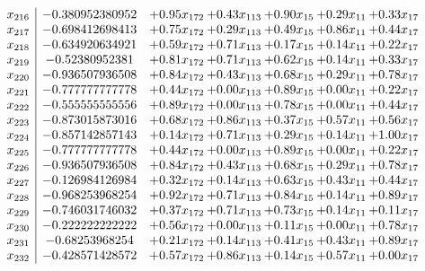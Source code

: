 \documentclass[8pt]{article}
\begin{document}
\[\begin{array}{c| c c@{\hskip 2pt} c@{\hskip 2pt} c@{\hskip 2pt} c@{\hskip 2pt} c@{\hskip 2pt} }
 x_{216}   &  -0.380952380952 & +  0.95 x_{172} & +  0.43 x_{113} & +  0.90 x_{15} & +  0.29 x_{11} & +  0.33 x_{17}\\
 x_{217}   &  -0.698412698413 & +  0.75 x_{172} & +  0.29 x_{113} & +  0.49 x_{15} & +  0.86 x_{11} & +  0.44 x_{17}\\
 x_{218}   &  -0.634920634921 & +  0.59 x_{172} & +  0.71 x_{113} & +  0.17 x_{15} & +  0.14 x_{11} & +  0.22 x_{17}\\
 x_{219}   &  -0.52380952381 & +  0.81 x_{172} & +  0.71 x_{113} & +  0.62 x_{15} & +  0.14 x_{11} & +  0.33 x_{17}\\
 x_{220}   &  -0.936507936508 & +  0.84 x_{172} & +  0.43 x_{113} & +  0.68 x_{15} & +  0.29 x_{11} & +  0.78 x_{17}\\
 x_{221}   &  -0.777777777778 & +  0.44 x_{172} & +  0.00 x_{113} & +  0.89 x_{15} & +  0.00 x_{11} & +  0.22 x_{17}\\
 x_{222}   &  -0.555555555556 & +  0.89 x_{172} & +  0.00 x_{113} & +  0.78 x_{15} & +  0.00 x_{11} & +  0.44 x_{17}\\
 x_{223}   &  -0.873015873016 & +  0.68 x_{172} & +  0.86 x_{113} & +  0.37 x_{15} & +  0.57 x_{11} & +  0.56 x_{17}\\
 x_{224}   &  -0.857142857143 & +  0.14 x_{172} & +  0.71 x_{113} & +  0.29 x_{15} & +  0.14 x_{11} & +  1.00 x_{17}\\
 x_{225}   &  -0.777777777778 & +  0.44 x_{172} & +  0.00 x_{113} & +  0.89 x_{15} & +  0.00 x_{11} & +  0.22 x_{17}\\
 x_{226}   &  -0.936507936508 & +  0.84 x_{172} & +  0.43 x_{113} & +  0.68 x_{15} & +  0.29 x_{11} & +  0.78 x_{17}\\
 x_{227}   &  -0.126984126984 & +  0.32 x_{172} & +  0.14 x_{113} & +  0.63 x_{15} & +  0.43 x_{11} & +  0.44 x_{17}\\
 x_{228}   &  -0.968253968254 & +  0.92 x_{172} & +  0.71 x_{113} & +  0.84 x_{15} & +  0.14 x_{11} & +  0.89 x_{17}\\
 x_{229}   &  -0.746031746032 & +  0.37 x_{172} & +  0.71 x_{113} & +  0.73 x_{15} & +  0.14 x_{11} & +  0.11 x_{17}\\
 x_{230}   &  -0.222222222222 & +  0.56 x_{172} & +  0.00 x_{113} & +  0.11 x_{15} & +  0.00 x_{11} & +  0.78 x_{17}\\
 x_{231}   &  -0.68253968254 & +  0.21 x_{172} & +  0.14 x_{113} & +  0.41 x_{15} & +  0.43 x_{11} & +  0.89 x_{17}\\
 x_{232}   &  -0.428571428572 & +  0.57 x_{172} & +  0.86 x_{113} & +  0.14 x_{15} & +  0.57 x_{11} & +  0.00 x_{17}\\

\end{array}\]
\end{document}
